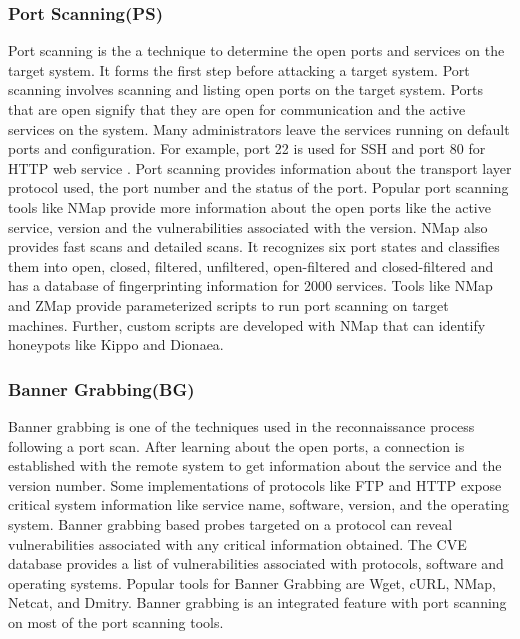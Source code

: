 \subsubsection{Port Scanning(PS)}
Port scanning is the a technique to determine the open ports and services on the target system. It forms the first step before attacking a target system. Port scanning involves scanning and listing open ports on the target system. Ports that are open signify that they are open for communication and the active services on the system. Many administrators leave the services running on default ports and configuration. For example, port 22 is used for SSH and port 80 for HTTP web service . Port scanning provides information about the transport layer protocol used, the port number and the status of the port. Popular port scanning tools like NMap\cite{NMap} provide more information about the open ports like the active service, version and the vulnerabilities associated with the version. NMap also provides fast scans and detailed scans. It recognizes six port states and classifies them into open, closed, filtered, unfiltered, open-filtered and closed-filtered and has a database of fingerprinting information for 2000 services. 
Tools like NMap and ZMap \cite{zmap} provide parameterized scripts to run port scanning on target machines. Further, custom scripts are  developed with NMap that can identify honeypots like Kippo and Dionaea.  

\subsubsection{Banner Grabbing(BG)}
Banner grabbing is one of the techniques used in the reconnaissance process following a port scan. After learning about the open ports, a connection is established with the remote system to get information about the service and the version number. Some implementations of protocols like FTP and HTTP expose critical system information like service name, software, version, and the operating system. Banner grabbing based probes targeted on a protocol can reveal vulnerabilities associated with any critical information obtained. The CVE database \cite{CVE} provides a list of vulnerabilities associated with protocols, software and operating systems. Popular tools for Banner Grabbing are Wget, cURL, NMap, Netcat, and Dmitry.  Banner grabbing is an integrated feature with port scanning on most of the port scanning tools.  

